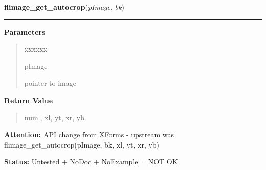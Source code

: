\hspace{.8\funcindent}\begin{boxedminipage}{\funcwidth}

    \raggedright \textbf{flimage\_get\_autocrop}(\textit{pImage}, \textit{bk})

    \vspace{-1.5ex}

    \rule{\textwidth}{0.5\fboxrule}
\setlength{\parskip}{2ex}
\setlength{\parskip}{1ex}
      \textbf{Parameters}
      \vspace{-1ex}

      \begin{quote}
        \begin{Ventry}{xxxxxx}

          \item[pImage]

          pointer to image

        \end{Ventry}

      \end{quote}

      \textbf{Return Value}
    \vspace{-1ex}

      \begin{quote}
      num., xl, yt, xr, yb

      \end{quote}

\textbf{Attention:} API change from XForms - upstream was flimage\_get\_autocrop(pImage, bk, 
xl, yt, xr, yb)



\textbf{Status:} Untested + NoDoc + NoExample = NOT OK



    \end{boxedminipage}

    \label{xformslib:library:flimage_crop}

    \vspace{0.5ex}

